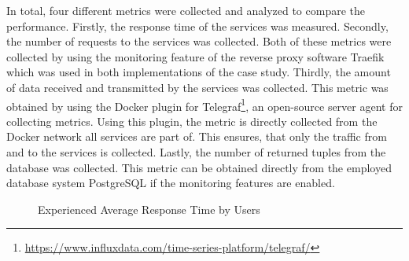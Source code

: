 In total, four different metrics were collected and analyzed to compare the performance.
Firstly, the response time of the services was measured.
Secondly, the number of requests to the services was collected.
Both of these metrics were collected by using the monitoring feature of the reverse proxy software Traefik which was used in both implementations of the case study.
Thirdly, the amount of data received and transmitted by the services was collected.
This metric was obtained by using the Docker plugin for Telegraf\footnote{\url{https://www.influxdata.com/time-series-platform/telegraf/}}, an open-source server agent for collecting metrics.
Using this plugin, the metric is directly collected from the Docker network all services are part of.
This ensures, that only the traffic from and to the services is collected.
Lastly, the number of returned tuples from the database was collected.
This metric can be obtained directly from the employed database system PostgreSQL if the monitoring features are enabled.

\begin{figure}[!h]
    \centering
    \caption{Experienced Average Response Time by Users}\label{fig:exp-resp-time}    
\end{figure}

